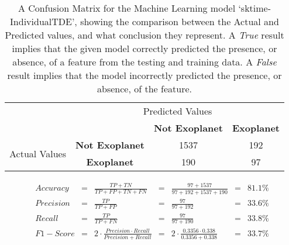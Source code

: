 
    \renewcommand{\arraystretch}{2}
    \renewcommand{\tabcolsep}{20.25pt}
    \vspace{-0.5cm}
    \begin{table}[ht]
    \begin{tabular}{cccc}
     & \multicolumn{3}{c}{Predicted Values} \\ \cline{3-4}
     & \multicolumn{1}{c|}{} & \multicolumn{1}{c|}{\textbf{Not Exoplanet}} & \multicolumn{1}{c|}{\textbf{Exoplanet}} \\ \cline{2-4}
    \multicolumn{1}{c|}{\multirow{2}{2.0cm}{Actual Values}} & \multicolumn{1}{c|}{\textbf{Not Exoplanet}} & \multicolumn{1}{c|}{1537} & \multicolumn{1}{c|}{192} \\ \cline{2-4}
    \multicolumn{1}{c|}{} & \multicolumn{1}{c|}{\textbf{Exoplanet}} & \multicolumn{1}{c|}{190} & \multicolumn{1}{c|}{97} \\ \cline{2-4}
    \end{tabular}
    \caption{A Confusion Matrix for the Machine Learning model `sktime-IndividualTDE', showing the comparison between the Actual and Predicted values, and what conclusion they represent. A \emph{True} result implies that the given model correctly predicted the presence, or absence, of a feature from the testing and training data. A \emph{False} result implies that the model incorrectly predicted the presence, or absence, of the feature.}
    \label{tab:sktime-IndividualTDEconfusionmatrix}
    \end{table}
    \vspace{-0.75cm}
    \label{eq:metrics-sktime-IndividualTDE}
    \begin{align*}
        Accuracy &= &\frac{TP + TN}{TP + FP + TN + FN} &= &\frac{97 + 1537}{97 + 192 + 1537 + 190} &= & 81.1\% \\
        Precision &= &\frac{TP}{TP + FP} &= &\frac{97}{97 + 192} &= & 33.6\% \\
        Recall &= &\frac{TP}{TP + FN} &= &\frac{97}{97 + 190} &= & 33.8\% \\
        F1-Score &= &2 \cdot \frac{Precision \cdot Recall}{Precision + Recall} &= &2 \cdot \frac{0.3356 \cdot 0.338}{0.3356 + 0.338} &= & 33.7\% \\
    \end{align*}
    \vspace{-1.75cm}
    \renewcommand{\arraystretch}{1}
    \renewcommand{\tabcolsep}{5.25pt}
    
